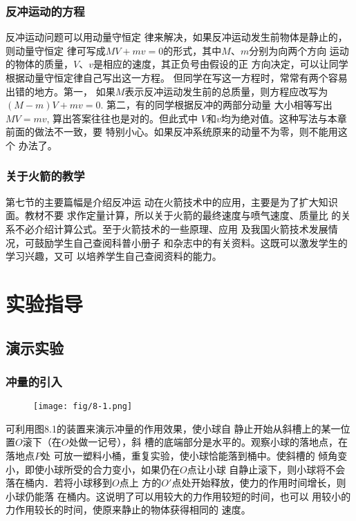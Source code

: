 \subsubsection{反冲运动的方程}

反冲运动问题可以用动量守恒定
律来解决，如果反冲运动发生前物体是静止的，则动量守恒定
律可写成$MV+mv=0$的形式，其中$M$、$m$分别为向两个方向
运动的物体的质量，$V$、$v$是相应的速度，其正负号由假设的正
方向决定，可以让同学根据动量守恒定律自己写出这一方程。
但同学在写这一方程时，常常有两个容易出错的地方。第一，
如果$M$表示反冲运动发生前的总质量，则方程应改写为
$(M-m)V+mv=0$. 第二，有的同学根据反冲的两部分动量
大小相等写出$MV=mv$, 算出答案往往也是对的。但此式中
$V$和$v$均为绝对值。这种写法与本章前面的做法不一致，要
特别小心。如果反冲系统原来的动量不为零，则不能用这个
办法了。

\subsubsection{关于火箭的教学}

第七节的主要篇幅是介绍反冲运
动在火箭技术中的应用，主要是为了扩大知识面。教材不要
求作定量计算，所以关于火箭的最终速度与喷气速度、质量比
的关系不必介绍计算公式。至于火箭技术的一些原理、应用
及我国火箭技术发展情况，可鼓励学生自己查阅科普小册子
和杂志中的有关资料。这既可以激发学生的学习兴趣，又可
以培养学生自己查阅资料的能力。

\section{实验指导}
\subsection{演示实验}
\subsubsection{冲量的引入}

\begin{figure}[htp]
    \centering
    \texttt{[image: fig/8-1.png]}
    \caption{}
\end{figure}

可利用图8.1的装置来演示冲量的作用效果，使小球自
静止开始从斜槽上的某一位置$O$滚下（在$O$处做一记号），斜
槽的底端部分是水平的。观察小球的落地点，在落地点$P$处
可放一塑料小桶，重复实验，使小球恰能落到桶中。使斜槽的
倾角变小，即使小球所受的合力变小，如果仍在$O$点让小球
自静止滚下，则小球将不会落在桶内．若将小球移到$O$点上
方的$O'$点处开始释放，使力的作用时间增长，则小球仍能落
在桶内。这说明了可以用较大的力作用较短的时间，也可以
用较小的力作用较长的时间，使原来静止的物体获得相同的
速度。

